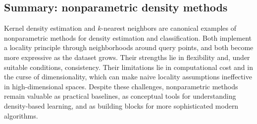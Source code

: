 \medskip

\subsection*{Summary: nonparametric density methods}

Kernel density estimation and \(k\)-nearest neighbors are canonical examples of nonparametric methods for density estimation and classification. Both implement a locality principle through neighborhoods around query points, and both become more expressive as the dataset grows. Their strengths lie in flexibility and, under suitable conditions, consistency. Their limitations lie in computational cost and in the curse of dimensionality, which can make naive locality assumptions ineffective in high-dimensional spaces. Despite these challenges, nonparametric methods remain valuable as practical baselines, as conceptual tools for understanding density-based learning, and as building blocks for more sophisticated modern algorithms.


%